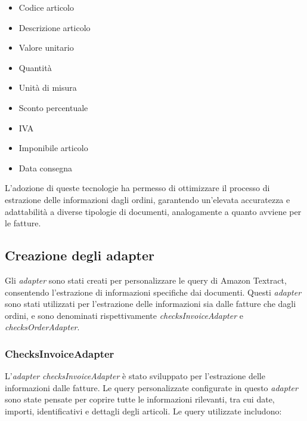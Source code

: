 \begin{itemize}
    \item Codice articolo
    \item Descrizione articolo
    \item Valore unitario
    \item Quantità
    \item Unità di misura
    \item Sconto percentuale
    \item IVA
    \item Imponibile articolo
    \item Data consegna
\end{itemize}

L'adozione di queste tecnologie ha permesso di ottimizzare il processo di estrazione delle informazioni dagli ordini, garantendo un'elevata accuratezza e adattabilità a diverse tipologie di documenti, analogamente a quanto avviene per le fatture.

\subsection{Creazione degli adapter}
Gli \textit{adapter} sono stati creati per personalizzare le query di Amazon Textract, consentendo l'estrazione di informazioni specifiche dai documenti. Questi \textit{adapter} sono stati utilizzati per l'estrazione delle informazioni sia dalle fatture che dagli ordini, e sono denominati rispettivamente \textit{checksInvoiceAdapter} e \textit{checksOrderAdapter}.

\subsubsection{ChecksInvoiceAdapter}
L'\textit{adapter} \textit{checksInvoiceAdapter} è stato sviluppato per l'estrazione delle informazioni dalle fatture. Le query personalizzate configurate in questo \textit{adapter} sono state pensate per coprire tutte le informazioni rilevanti, tra cui date, importi, identificativi e dettagli degli articoli. Le query utilizzate includono:

